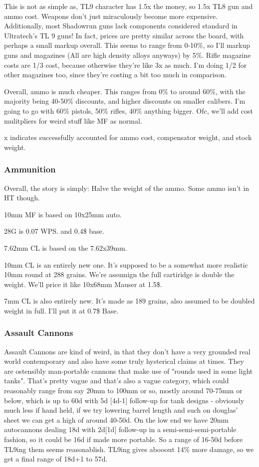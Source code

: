 \begin{multicols*}{2}
	 This is not as simple as, TL9 character has 1.5x the money, so 1.5x TL8 gun and ammo cost. Weapons don't just miraculously become more expensive. Additionally, most Shadowrun guns lack components considered standard in Ultratech's TL 9 guns! In fact, prices are pretty similar across the board, with perhaps a small markup overall. This seems to range from 0-10\%, so I'll markup guns and magazines (All are high density alloys anyways) by 5\%. Rifle magazine costs are 1/3 cost, because otherwise they're like 3x as much. I'm doing 1/2 for other magazines too, since they're costing a bit too much in comparison.
	 
	 Overall, ammo is much cheaper. This ranges from 0\% to around 60\%, with the majority being 40-50\% discounts, and higher discounts on smaller calibers. I'm going to go with 60\% pistols, 50\% rifles, 40\% anything bigger. Ofc, we'll add cost mulitpliers for weird stuff like MF as normal.
	 
	 x indicates successfully accounted for ammo cost, compensator weight, and stock weight.
	 
	 \subsubsection{Ammunition}
	 Overall, the story is simply: Halve the weight of the ammo. Some ammo isn't in HT though. 
	 
	 10mm MF is based on 10x25mm auto.
	 
	 28G is 0.07  WPS. and 0.4\$ base.
	 
	 7.62mm CL is based on the 7.62x39mm.
	 
	 10mm CL is an entirely new one. It's supposed to be a somewhat more realistic 10mm round at 288 grains. We're assumign the full cartiridge is double the weight. We'll price it like 10x68mm Mauser at 1.5\$.
	 
	 7mm CL is also entirely new. It's made as 189 grains, also assumed to be doubled weight in full. I'll put it at 0.7\$ Base.
	 	
	\subsubsection{Assault Cannons}
	
	Assault Cannons are kind of weird, in that they don't have a very grounded real world contemporary and also have some truly hysterical claims at times. They are ostensibly man-portable cannons that make use of "rounds used in some light tanks". That's pretty vague and that's also a vague category, which could reasonably range from say 20mm to 100mm or so, mostly around 70-75mm or below, which is up to 60d with 5d [4d-1] follow-up for tank designs - obviously much less if hand held, if we try lowering barrel length and such on douglas' sheet we can get a high of around 40-50d. On the low end we have 20mm autocannons dealing 18d with 2d[1d] follow-up in a semi-semi-semi-portable fashion, so it could be 16d if made more portable. So a range of 16-50d before TL9ing them seems reasonablish. TL9ing gives abooout 14\% more damage, so we get a final range of 18d+1 to 57d. 
	

\end{multicols*}
